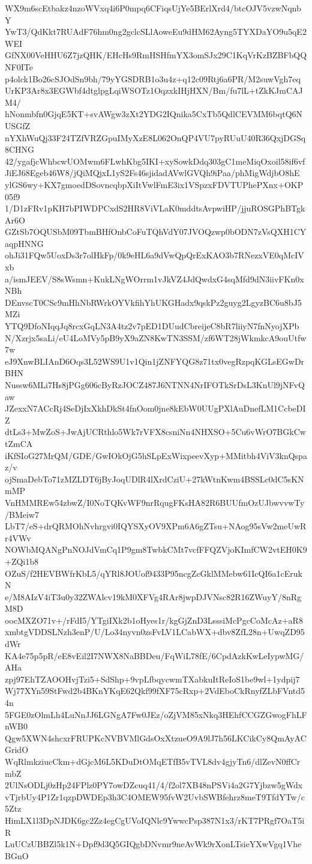 WX9m6scEtbakz4nzoWVxq4i6P0mpq6CFiqsUjYe5BErlXrd4/btcOJV5vzwNqnbY
YwT3/QdKkt7RUAdF76hm0ng2gclcSLlAoweEu9dHM62Ayng5TYXDaYO9u5qE2WEI
GfNX00VeHHU6Z7jzQHK/EHcHs9RmHSHfmYX3omSJx29C1KqVrKzBZBFbQQNF0ITe
p4olck1Bo26cSJOdSn9bh/79yYGSDRB1o3u4z+q12c09Rtj6a6PR/M2suwVgh7eq
UrKP3Ar8x3EGWbf4dtglpgLqiWSOTz1OqzxkIHjHXN/Bm/fu7lL+tZkKJmCAJM4/
hNonmbfn0GjqE5KT+svAWgw3zXt2YDG2IQnika5CxTb5QdlCEVMM6bqtQ6NUSGfZ
nYXhWuQj33F24TZfVRZGpuIMyXzE8L062OnQP4VU7pyRUuU40R36QxjDGSq8CHNG
42/ygafjcWhbcwUOMwm6FLwhKbg5IKI+xySowkDdq303gC1meMiqOxoil58if6vf
JiEJ68Egeb46W8/jQiMQjxL1yS2Fs46sjidadAVwlGVQh9iPaa/phMigWdjbO8hE
ylGS6wy+KX7gmoedDSovncqbpXiItVwlFmE3ix1VSpzxFDVTUPhePXnx+OKP05f9
1/D1zFRv1pKH7bPIWDPCxdS2HR8ViVLaK0mddtsAvpwiHP/jjuROSGPhBTgkAr6O
GZtSb7OQUSbM09TbmBHfOnbCoFuTQhVdY07JVOQzwp0bODN7zVsQXH1CYaqpHNNG
ohJi31FQw5UoxDs3r7olHkFp/0k9eHL6a9dVwQpQrExKAO3b7RNezxVE0qMcIVxb
a/ismJEEV/S8sWsmn+KukLNgWOrrm1vJkVZ4JdQwdxG4sqMfd9dN3iivFKn0xNBh
DEnvscT0CSc9mHhNbRWrkOYVkfihYhUKGHadx9qskPz2guyg2LgyzBC6u8bJ5MZi
YTQ9DfoNIqqJq8rcxGqLN3A4tz2v7pED1DUudCbreijeC8bR7liiyN7fnNyojXPb
N/Xzrjx5saLi/eU4LoMVy5pB9yX9aZN8KwTN3SSM/zf6WT28jWkmkcA9ouUtfw7w
eJ9XnwBLIAnD6Oqs3L52WS9U1v1Qin1jZNFYQG8z71tx0vegRzpqKGLsEGwDrBHN
Nussw6MLi7Hs8jPGg606cByRzJOCZ487J6NTNN4NrIFOTkSrDsL3KnUl9jNFvQaw
JZexxN7ACcRj4SeDjIxXkhDkSt4fnOom0jne8kEbW0UUgPXlAuDnefLM1CcbeDIZ
dtLs3+MwZoS+JwAjUCRthlo5Wk7rVFX8csniNn4NHXSO+5Cu6vWrO7BGkCwtZmCA
iKfSIoG27MrQM/GDE/GwIOkOjG5hSLpExWixpeevXyp+MMitbh4ViV3knQspaz/v
ojSmaDebTo71zMZLDT6jByJoqUDlR4lXrdCziU+27kWtnKwm4BSSLc0dC5sKNmMP
VnHMMREw54zbwZ/I0NoTQKvWF9nrRqugFKsHA82R6BUUfmOzUJbwvvwTy/BMeiw7
LbT7/eS+drQRMOhNvhrgvi0IQYSXyOV9XPm6A6gZTsu+NAog95sVw2meUwRr4VWv
NOWbMQANgPnNOJdVmCq1P9gm8TwbkCMt7vcfFFQZVjoKImfCW2vtEH0K9+ZQi1b8
OZuS/f2HEVBWfrKbL5/qYRl8JOUof9433P95ncgZcGklMMebw61IcQI6a1cErukN
e/M8AIzV4iT3u0y32ZWAlcv19kM0XFVg4RAr8jwpDJVNsc82R16ZWuyY/8nRgM8D
oocMXZO71v+/rFdI5/YTgiIXk2b1oHyes1r/kgGjZnD3LsssiMcPgcCoMcAz+aR8
xmbtgVDDSLNzh3enP/U/Lo34nyvn0zsFvLV1LCabWX+dbv8ZfL28n+UwqZD95dWr
KA4e75p5pR/eE8vEil2I7NWX8NaBBDeu/FqWiL78fE/6CpdAzkKwLeIypwMG/AHa
zpj97EhTZAOOHvjTzi5+SdShp+9vpLfbqycwmTXabkuItReIoS1be9wl+1ydpij7
Wj77XYn59StFwd2b4BKnYKqE62Qkf99fXF75cRxp+2VdEboCkRnyfZLbFVntd54n
5FGE0zOlmLh4LuNnJJ6LGNgA7Fw0JEz/oZjVM85xNkq3HEhfCCGZGwogFhLFnWB0
Qgw5XWN4shcxrFRUPKcNVBVMlGdsOxXtzueO9A9lJ7h56LKCikCy8QmAyACGridO
WqRlmkziucCkm+dGjcM6L5KDuDtOMqETfB5vTVL8dv4gjyTn6/dlZevN0ffCrmbZ
2UlNsODLj0zHp24FPlz0PY7owDZcuq41/4/f2ol7XB48nPSVi4a2G7Yjbzw5gWdx
vTjrbUy4P1Zr1qzpDWDEp3h3C4OMEW95fvW2UvbSWBfehrz8meT9TfdYTw/c5Ztz
HimLX1l3DpNJDK6gc2Zz4egCgUVoIQNlc9YwwcPsp387N1x3/rKT7PRgf7OaT5iR
LuUCzUBBZl5k1N+Dpf9d3Q5GIQgbDNvmr9neAvWk9rXonLTsieYXwVgq1VheBGnO
